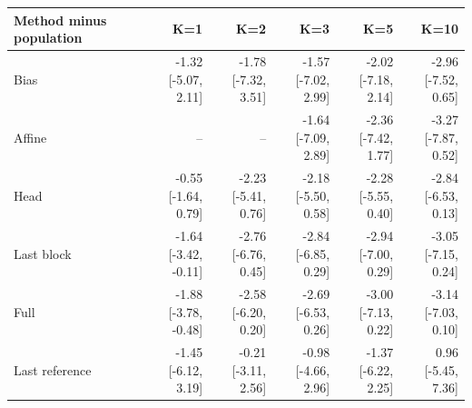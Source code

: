 \documentclass[11pt]{article}
\begin{document}
\begin{table}[!htbp]\centering\scriptsize\setlength{\tabcolsep}{3pt}
\begin{tabular}{lrrrrr}\toprule
Method minus population & K=1 & K=2 & K=3 & K=5 & K=10\\\midrule
Bias & \shortstack{-1.32\\{[-5.07, 2.11]}} & \shortstack{-1.78\\{[-7.32, 3.51]}} & \shortstack{-1.57\\{[-7.02, 2.99]}} & \shortstack{-2.02\\{[-7.18, 2.14]}} & \shortstack{-2.96\\{[-7.52, 0.65]}}\\
Affine & -- & -- & \shortstack{-1.64\\{[-7.09, 2.89]}} & \shortstack{-2.36\\{[-7.42, 1.77]}} & \shortstack{-3.27\\{[-7.87, 0.52]}}\\
Head & \shortstack{-0.55\\{[-1.64, 0.79]}} & \shortstack{-2.23\\{[-5.41, 0.76]}} & \shortstack{-2.18\\{[-5.50, 0.58]}} & \shortstack{-2.28\\{[-5.55, 0.40]}} & \shortstack{-2.84\\{[-6.53, 0.13]}}\\
Last block & \shortstack{-1.64\\{[-3.42, -0.11]}} & \shortstack{-2.76\\{[-6.76, 0.45]}} & \shortstack{-2.84\\{[-6.85, 0.29]}} & \shortstack{-2.94\\{[-7.00, 0.29]}} & \shortstack{-3.05\\{[-7.15, 0.24]}}\\
Full & \shortstack{-1.88\\{[-3.78, -0.48]}} & \shortstack{-2.58\\{[-6.20, 0.20]}} & \shortstack{-2.69\\{[-6.53, 0.26]}} & \shortstack{-3.00\\{[-7.13, 0.22]}} & \shortstack{-3.14\\{[-7.03, 0.10]}}\\
Last reference & \shortstack{-1.45\\{[-6.12, 3.19]}} & \shortstack{-0.21\\{[-3.11, 2.56]}} & \shortstack{-0.98\\{[-4.66, 2.96]}} & \shortstack{-1.37\\{[-6.22, 2.25]}} & \shortstack{0.96\\{[-5.45, 7.36]}}\\

\end{tabular}
\end{table}
\end{document}
